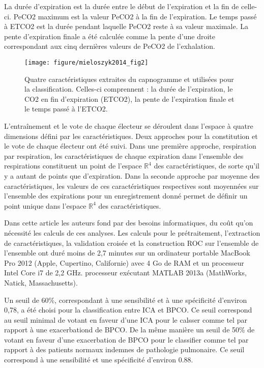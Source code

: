 \documentclass[12pt,]{article}
\begin{document}
La durée d'expiration est la durée entre le début de l'expiration et la
fin de celle-ci. PeCO2 maximum est la valeur PeCO2 à la fin de
l'expiration. Le temps passé à ETCO2 est la durée pendant laquelle PeCO2
reste à sa valeur maximale. La pente d'expiration finale a été calculée
comme la pente d'une droite correspondant aux cinq dernières valeurs de
PeCO2 de l'exhalation.

\begin{figure}[h!]

{\centering \texttt{[image: figure/mieloszyk2014\_fig2]} 

}

\caption{Quatre caractéristiques extraites du capnogramme et utilisées pour la classification. Celles-ci comprennent : la durée de l'expiration, le CO2 en fin d'expiration (ETCO2), la pente de l'expiration finale et le temps passé à l'ETCO2.}\label{fig:unnamed-chunk-10}
\end{figure}

L'entraînement et le vote de chaque électeur se déroulent dans l'espace
à quatre dimensions défini par les caractéristiques. Deux approches pour
la constitution et le vote de chaque électeur ont été suivi. Dans une
première approche, respiration par respiration, les caractéristiques de
chaque expiration dans l'ensemble des respirations constituent un point
de l'espace \(\mathbb R^{4}\) des caractéristiques, de sorte qu'il y a
autant de points que d'expiration. Dans la seconde approche par moyenne
des caractéristiques, les valeurs de ces caractéristiques respectives
sont moyennées sur l'ensemble des expirations pour un enregistrement
donné permet de définir un point unique dans l'espace \(\mathbb R^{4}\)
des caractéristiques.

Dans cette article les auteurs fond par des besoins informatiques, du
coût qu'on nécessité les calculs de ces analyses. Les calculs pour le
prétraitement, l'extraction de caractéristiques, la validation croisée
et la construction ROC sur l'ensemble de l'ensemble ont duré moins de
2,7 minutes sur un ordinateur portable MacBook Pro 2012 (Apple,
Cupertino, Californie) avec 4 Go de RAM et un processeur Intel Core i7
de 2,2 GHz. processeur exécutant MATLAB 2013a (MathWorks, Natick,
Massachusetts).

Un seuil de 60\%, correspondant à une sensibilité et à une spécificité
d'environ 0,78, a été choisi pour la classification entre ICA et BPCO.
Ce seuil correspond au seuil minimal de votant en faveur d'une ICA pour
le calsser comme tel par rapport à une exacerbationd de BPCO. De la même
manière un seuil de 50\% de votant en faveur d'une exacerbation de BPCO
pour le classifier comme tel par rapport à des patients normaux indemnes
de pathologie pulmonaire. Ce seuil correspond à une sensibilité et une
spécificité d'environ 0.88.
\end{document}
